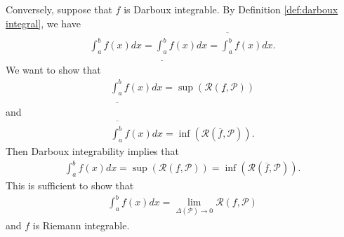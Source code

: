 \documentclass{book}
\theoremstyle{defstyle}
\theoremstyle{thmstyle}
\DeclareMathOperator{\PiecewiseConstant}{p.c.}
\newcommand{\pcint}{\PiecewiseConstant\int}
\begin{document}
\begin{comment}
For the other hand, we see that for every $\mathcal{P}$, $f(x) := f(x_i^*)$ defined on $[x_{i - 1}, x_i]$ is piecewise constant, hence $\mathcal{R}(f, \mathcal{P}) = \pcint_{a}^{b}f(x)dx$. Then
    \begin{align*}
        \overline{\int_{a}^{b}}f(x)dx
         = \inf(\mathcal{R}(f, \mathcal{P}))
        \leq \int_{a}^{b}f(x)dx
        \leq \sup(\mathcal{R}(f, \mathcal{P}))
        = \underline{\int_{a}^{b}}f(x)dx.
    \end{align*}
\end{comment}

Conversely, suppose that $f$ is Darboux integrable. By Definition \ref{def:darboux integral}, we have
    \begin{align*}
        \int_{a}^{b}f(x)dx
        = \underline{\int_{a}^{b}}f(x)dx
        = \overline{\int_{a}^{b}}f(x)dx.
    \end{align*}
We want to show that
    \begin{align*}
        \underline{\int_{a}^{b}}f(x)dx = \sup(\mathcal{R}(\underline{f}, \mathcal{P}))
    \end{align*}
and
    \begin{align*}
        \overline{\int_{a}^{b}}f(x)dx = \inf(\mathcal{R}(\overline{f}, \mathcal{P})).
    \end{align*}
Then Darboux integrability implies that
    \begin{align*}
        \int_{a}^{b}f(x)dx = \sup(\mathcal{R}(\underline{f}, \mathcal{P})) = \inf(\mathcal{R}(\overline{f}, \mathcal{P})).
    \end{align*}
This is sufficient to show that
    \begin{align*}
        \int_{a}^{b}f(x)dx = \lim_{\Delta(\mathcal{P}) \to 0}\mathcal{R}(f, \mathcal{P})
    \end{align*}
and $f$ is Riemann integrable.
\end{document}
